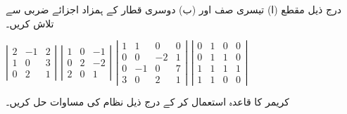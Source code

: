 درج ذیل مقطع (ا) تیسری صف اور (ب) دوسری قطار  کے ہمزاد اجزائے ضربی  سے تلاش کریں۔

\(
\left |
\begin{array}{rrr}
2&-1&2\\
1&0&3\\
0&2&1
\end{array} \right |
\)
\(
\left |
\begin{array}{rrr}
1&0&-1\\
0&2&-2\\
2&0&1
\end{array} \right |
\)
\(
\left |
\begin{array}{rrrr}
1&1&0&0\\
0&0&-2&1\\
0&-1&0&7\\
3&0&2&1
\end{array} \right |
\)
\(
\left |
\begin{array}{rrrr}
0&1&0&0\\
0&1&1&0\\
1&1&1&1\\
1&1&0&0
\end{array} \right |
\)

کریمر کا قاعدہ  استعمال کر کے  درج ذیل  نظام  کی مساوات حل کریں۔

